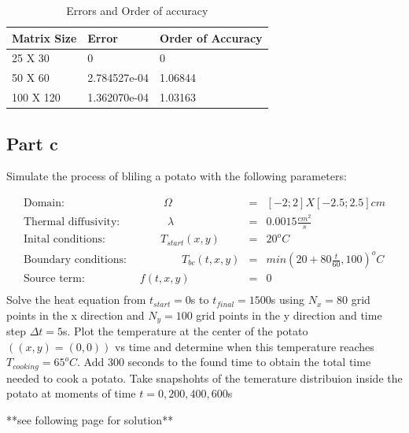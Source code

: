 \documentclass[12pt]{article}
\begin{document}
\begin{table}[bht]
\centering

\begin{tabular}{|l|l|l|}
\hline
Matrix Size & Error        & Order of Accuracy \\ \hline
25 X 30     & 0            & 0                 \\ \hline
50 X 60     & 2.784527e-04 & 1.06844           \\ \hline
100 X 120   & 1.362070e-04 & 1.03163           \\ \hline
\end{tabular}
\caption{Errors and Order of accuracy}
\label{Problem 1b}
\end{table}

\newpage
\subsection{Part c}\label{sec::c}
Simulate the process of bliling a potato with the following parameters:

\begin{eqnarray}
\textrm{Domain:}\quad \quad \quad \quad \quad \quad \quad \quad \quad \Omega &=& [-2;2]X[-2.5;2.5] cm  \\\nonumber
\textrm{Thermal diffusivity: }\quad \quad \quad \quad \lambda &=& 0.0015 \frac{cm^2}{s}\\\nonumber
\textrm{Inital conditions:}\quad \quad \quad \quad  \quad T_{start}(x,y)&=&20^o  C\\\nonumber
\textrm{Boundary conditions:}\quad \quad \quad \quad  \quad T_{bc}(t,x,y)&=&min(20 + 80 \frac{t}{60},100)^o  C\\\nonumber
\textrm{Source term:}\quad \quad \quad \quad  \quad f(t,x,y)&=&0\\\nonumber
\end{eqnarray}
Solve the heat equation from $t_{start} = 0$s to $t_{final}=1500$s using $N_x = 80$ grid points in the x direction and $N_y = 100$ grid points in the y direction and time step $\Delta t = 5$s.  Plot the temperature at the center of the potato$((x,y) = (0,0))$ vs time and determine when this temperature reaches $T_{cooking}=65^o C$.  Add 300 seconds to the found time to obtain the total time needed to cook a potato.  Take snapshohts of the temerature distribuion inside the potato at moments of time $t = 0, 200, 400, 600$s

**see following page for solution**
\end{document}
